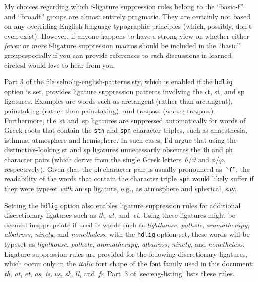 \documentclass[11pt]{article}
\newcommand{\pkg}[1]{\textsf{#1}}
\newcommand{\opt}[1]{\texttt{#1}}
\begin{document}
My choices regarding which f-ligature suppression rules belong to the \enquote{basic-f} and \enquote{broadf} groups are almost entirely pragmatic. They are certainly not based on any overriding English-language typographic principles (which, possibly, don't even exist). However, if anyone happens to have a strong view on whether either \emph{fewer} or \emph{more} f-ligature suppression macros should be included in the \enquote{basic} group\textemdash especially if you can provide references to such discussions in learned circles\textemdash I would love to hear from you.


Part 3 of the file \pkg{selnolig-english-patterns.sty}, which is enabled if the \opt{hdlig} option is set, provides ligature suppression patterns involving the \mbox{ct}, \mbox{st}, and \mbox{sp} ligatures. Examples are words such as arctangent (rather than ar\mbox{ct}angent), painstaking (rather than pain\mbox{st}aking), and trespass (worse: tre\mbox{sp}ass). Furthermore, the~st and~sp ligatures are suppressed automatically for words of Greek roots that contain the \opt{sth} and \opt{sph} character triples, such as anaesthesia, isthmus, atmosphere and hemisphere. In such cases, I'd argue that using the distinctive-looking st and sp ligatures unnecessarily obscures the \opt{th} and \opt{ph} character pairs (which derive from the single Greek letters~$\theta$/$\vartheta$ and $\phi$/$\varphi$, respectively). Given that the \opt{ph} character pair is usually pronounced as~\enquote{\opt{f}}, the readability of the words that contain the character triple \opt{sph} would likely suffer if they were typeset \emph{with} an sp ligature, e.g., as atmo\mbox{sp}here and \mbox{sp}herical, say.

Setting the \opt{hdlig} option also enables ligature suppression rules for additional discretionary ligatures such as \emph{th}, \emph{at}, and~\emph{et}. Using these ligatures might be deemed inappropriate if used in words such as \emph{ligh\mbox{th}ouse}, \emph{po\mbox{th}ole}, \emph{arom\mbox{at}herapy}, \emph{alb\mbox{at}ross}, \emph{nin\mbox{et}y}, and \emph{non\mbox{et}heless}; with the \opt{hdlig} option set, these words will be typeset as \emph{lighthouse}, \emph{pothole}, \emph{aromatherapy}, \emph{albatross}, \emph{ninety}, and \emph{nonetheless}. Ligature suppression rules are provided for the following discretionary ligatures, which occur only in the \emph{italic} font shape of the font family used in this document: \emph{th}, \emph{at}, \emph{et}, \emph{as}, \emph{is}, \emph{us}, {\ebg \emph{sk}}, \emph{ll}, and~\emph{fr}. Part~3 of \cref{sec:eng-listing} lists these rules.
\end{document}
